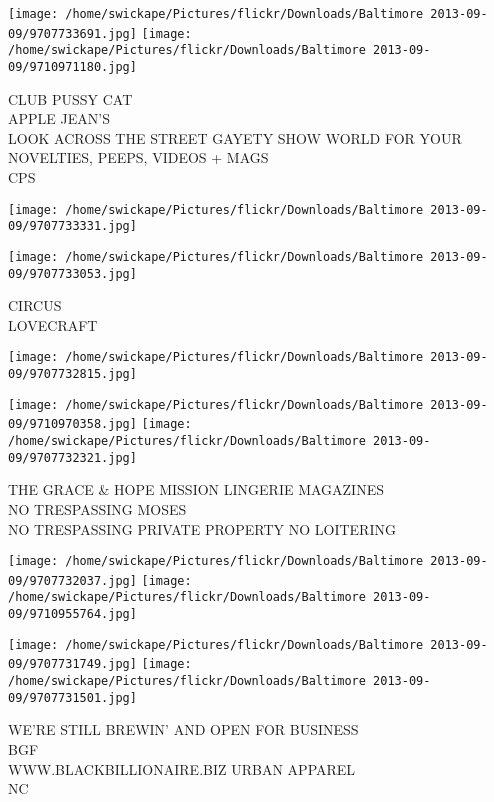\documentclass[10pt,letterpaper]{article}
\begin{document}
\texttt{[image: /home/swickape/Pictures/flickr/Downloads/Baltimore 2013-09-09/9707733691.jpg]}
\texttt{[image: /home/swickape/Pictures/flickr/Downloads/Baltimore 2013-09-09/9710971180.jpg]}

CLUB PUSSY CAT\\
APPLE JEAN'S\\
LOOK ACROSS THE STREET GAYETY SHOW WORLD FOR YOUR NOVELTIES, PEEPS, VIDEOS + MAGS\\
CPS\\
\pagebreak

\texttt{[image: /home/swickape/Pictures/flickr/Downloads/Baltimore 2013-09-09/9707733331.jpg]}

\vspace{0.25in}
\texttt{[image: /home/swickape/Pictures/flickr/Downloads/Baltimore 2013-09-09/9707733053.jpg]}

CIRCUS\\
LOVECRAFT\\
\pagebreak

\texttt{[image: /home/swickape/Pictures/flickr/Downloads/Baltimore 2013-09-09/9707732815.jpg]}

\vspace{0.25in}
\texttt{[image: /home/swickape/Pictures/flickr/Downloads/Baltimore 2013-09-09/9710970358.jpg]}
\texttt{[image: /home/swickape/Pictures/flickr/Downloads/Baltimore 2013-09-09/9707732321.jpg]}

THE GRACE \& HOPE MISSION LINGERIE MAGAZINES\\
NO TRESPASSING MOSES\\
NO TRESPASSING PRIVATE PROPERTY NO LOITERING\\
\pagebreak

\texttt{[image: /home/swickape/Pictures/flickr/Downloads/Baltimore 2013-09-09/9707732037.jpg]}
\texttt{[image: /home/swickape/Pictures/flickr/Downloads/Baltimore 2013-09-09/9710955764.jpg]}

\texttt{[image: /home/swickape/Pictures/flickr/Downloads/Baltimore 2013-09-09/9707731749.jpg]}
\texttt{[image: /home/swickape/Pictures/flickr/Downloads/Baltimore 2013-09-09/9707731501.jpg]}

WE'RE STILL BREWIN' AND OPEN FOR BUSINESS\\
BGF\\
WWW.BLACKBILLIONAIRE.BIZ URBAN APPAREL\\
NC\\
\pagebreak
\end{document}
